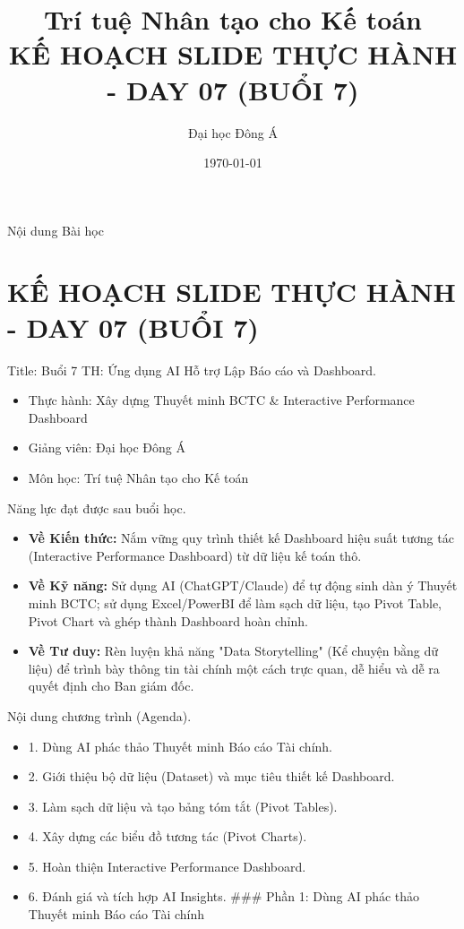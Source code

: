 \documentclass[aspectratio=169]{beamer}
\title[Trí tuệ Nhân tạo cho Kế toán]{Trí tuệ Nhân tạo cho Kế toán \\ \vspace{0.3cm} \Large KẾ HOẠCH SLIDE THỰC HÀNH - DAY 07 (BUỔI 7)}
\author{Đại học Đông Á}
\date{\today}
\begin{document}
\begin{frame}
    \titlepage
\end{frame}

\begin{frame}{Nội dung Bài học}
    \tableofcontents
\end{frame}


\section{KẾ HOẠCH SLIDE THỰC HÀNH - DAY 07 (BUỔI 7)}


\begin{frame}{Title: Buổi 7 TH: Ứng dụng AI Hỗ trợ Lập Báo cáo và Dashboard.}
    \begin{itemize}
        \item Thực hành: Xây dựng Thuyết minh BCTC \& Interactive Performance Dashboard
        \item Giảng viên: Đại học Đông Á
        \item Môn học: Trí tuệ Nhân tạo cho Kế toán
    \end{itemize}
\end{frame}


\begin{frame}{Năng lực đạt được sau buổi học.}
    \begin{itemize}
        \item \textbf{Về Kiến thức:} Nắm vững quy trình thiết kế Dashboard hiệu suất tương tác (Interactive Performance Dashboard) từ dữ liệu kế toán thô.
        \item \textbf{Về Kỹ năng:} Sử dụng AI (ChatGPT/Claude) để tự động sinh dàn ý Thuyết minh BCTC; sử dụng Excel/PowerBI để làm sạch dữ liệu, tạo Pivot Table, Pivot Chart và ghép thành Dashboard hoàn chỉnh.
        \item \textbf{Về Tư duy:} Rèn luyện khả năng "Data Storytelling" (Kể chuyện bằng dữ liệu) để trình bày thông tin tài chính một cách trực quan, dễ hiểu và dễ ra quyết định cho Ban giám đốc.
    \end{itemize}
\end{frame}


\begin{frame}{Nội dung chương trình (Agenda).}
    \begin{itemize}
        \item 1. Dùng AI phác thảo Thuyết minh Báo cáo Tài chính.
        \item 2. Giới thiệu bộ dữ liệu (Dataset) và mục tiêu thiết kế Dashboard.
        \item 3. Làm sạch dữ liệu và tạo bảng tóm tắt (Pivot Tables).
        \item 4. Xây dựng các biểu đồ tương tác (Pivot Charts).
        \item 5. Hoàn thiện Interactive Performance Dashboard.
        \item 6. Đánh giá và tích hợp AI Insights.
        ### Phần 1: Dùng AI phác thảo Thuyết minh Báo cáo Tài chính
    \end{itemize}
\end{frame}
\end{document}
